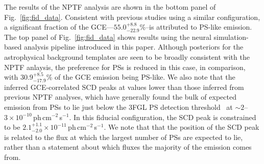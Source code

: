 \documentclass[prd,aps,10pt,nofootinbib,twocolumn,superscriptaddress,preprintnumbers,balancelastpage,longbibliography]{revtex4-1}
\begin{document}
The results of the NPTF analysis are shown in the bottom panel of Fig.~\ref{fig:fid_data}. Consistent with previous studies using a similar configuration, a significant fraction of the GCE---$55.0^{+8.8}_{-22.9}\%$--is attributed to PS-like emission.
The top panel of Fig.~\ref{fig:fid_data} shows results using the neural simulation-based analysis pipeline introduced in this paper. Although posteriors for the astrophysical background templates are seen to be broadly consistent with the NPTF anlaysis, the preference for PSs is reduced in this case, in comparison, with $30.9^{+8.5}_{-17.9}\%$ of the GCE emission being PS-like. We also note that the inferred GCE-correlated SCD peaks at values lower than those inferred from previous NPTF analyses, which have generally found the bulk of expected emission from PSs to lie just below the 3FGL PS detection threshold~\cite{Lee:2015fea} at $\sim2$--$3\times 10^{-10}$\,ph\,cm$^{-2}$\,s$^{-1}$. In this fiducial configuration, the SCD peak is constrained to be $2.1^{+1.1}_{-2.0}\times 10^{-11}$\,ph\,cm$^{-2}$\,s$^{-1}$. We note that that the position of the SCD peak is related to the flux at which the largest number of PSs are expected to lie, rather than a statement about which fluxes the majority of the emission comes from.
\end{document}
